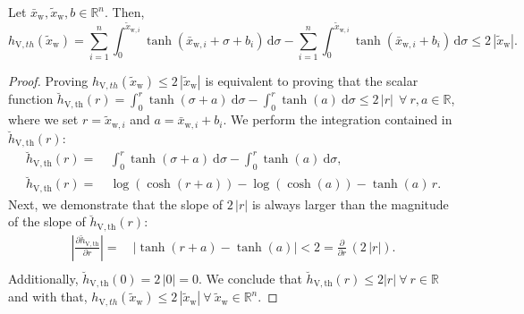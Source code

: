 \begin{lemma}\label{lemma:con:V_tanh_term_upper_bound}
    Let $\bar{x}_{\mathrm{w}}, \tilde{x}_{\mathrm{w}}, b \in \mathbb{R}^n$.
    Then,
    \begin{equation}
        h_{\mathrm{V},th}(\tilde{x}_{\mathrm{w}}) = \sum_{i=1}^n \int_{0}^{\tilde{x}_{\mathrm{w},i}} \tanh(\bar{x}_{\mathrm{w},i}+\sigma+b_i) \, \mathrm{d} \sigma - \sum_{i=1}^n \int_{0}^{\tilde{x}_{\mathrm{w},i}} \tanh(\bar{x}_{\mathrm{w},i}+b_i) \, \mathrm{d} \sigma \leq 2 \, \left | \tilde{x}_{\mathrm{w}} \right |.
    \end{equation}
\end{lemma}
\begin{proof}
    Proving $h_{\mathrm{V},th}(\tilde{x}_{\mathrm{w}}) \leq 2 \, \left | \tilde{x}_{\mathrm{w}} \right |$ is equivalent to proving that the scalar function $\breve{h}_{\mathrm{V},\mathrm{th}}(r) = \int_0^{r} \tanh(\sigma + a) \: \mathrm{d}\sigma - \int_0^{r} \tanh(a) \: \mathrm{d}\sigma  \leq 2 \, |r| \: \: \forall \: r, a \in \mathbb{R}$, where we set $r = \tilde{x}_{\mathrm{w},i}$ and $a = \bar{x}_{\mathrm{w},i} + b_i$.
    We perform the integration contained in $\breve{h}_{\mathrm{V},\mathrm{th}}(r)$:
    \begin{equation}
    \begin{split}
        \breve{h}_{\mathrm{V},\mathrm{th}}(r) =& \: \int_0^{r} \tanh(\sigma + a) \: \mathrm{d}\sigma - \int_0^{r} \tanh(a) \: \mathrm{d}\sigma,\\
        \breve{h}_{\mathrm{V},\mathrm{th}}(r) =& \: \log(\cosh(r+a)) - \log(\cosh(a)) - \tanh(a) \, r.
    \end{split}
    \end{equation}
    Next, we demonstrate that the slope of $2 \, |r|$ is always larger than the magnitude of the slope of $\breve{h}_{\mathrm{V},\mathrm{th}}(r)$:
    \begin{equation}
    \begin{split}
        \left | \frac{\partial \breve{h}_{\mathrm{V},\mathrm{th}}}{\partial r} \right | =& \: \left | \tanh(r+a) - \tanh(a) \right | < 2 = \frac{\partial}{\partial r} \, (2 \, |r|).\\
    \end{split}
    \end{equation}
    Additionally, $\breve{h}_{\mathrm{V},\mathrm{th}}(0) = 2 \, |0| = 0$. We conclude that $\breve{h}_{\mathrm{V},\mathrm{th}}(r) \leq 2 |r| \: \forall \: r \in \mathbb{R}$ and with that, $h_{\mathrm{V},th}(\tilde{x}_{\mathrm{w}}) \leq 2 \, \left | \tilde{x}_{\mathrm{w}} \right | \: \forall \: \tilde{x}_{\mathrm{w}} \in \mathbb{R}^n$.
\end{proof}

